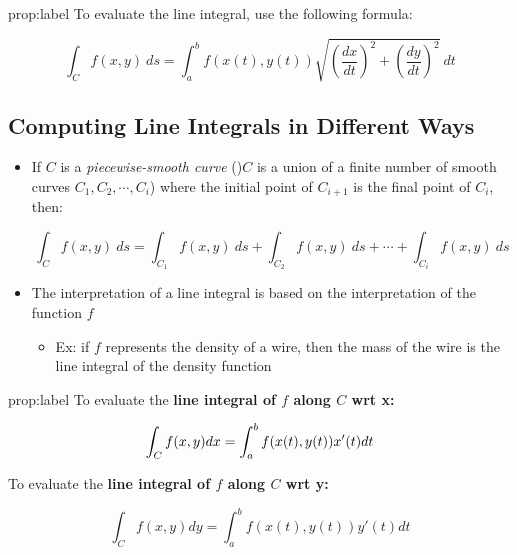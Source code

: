 \documentclass{package/notes}
\begin{document}
\begin{proposition}{prop:label}
	To evaluate the line integral, use the following formula:

	$$\int_Cf(x,y)\:ds=\int_a^bf(x(t),y(t))\sqrt{\left(\frac{dx}{dt}\right)^2+\left(\frac{dy}{dt}\right)^2}\:dt$$
\end{proposition}


\subsection{Computing Line Integrals in Different Ways}

\begin{itemize}
	\item If $C$ is a \textit{piecewise-smooth curve} ()$C$ is a union of a finite number of smooth curves $C_1,C_2,\cdots,C_i$) where the initial point of $C_{i+1}$ is the final point of $C_i$, then:
	
	$$\int_Cf(x,y)\:ds = \int_{C_1}f(x,y)\:ds + \int_{C_2}f(x,y)\:ds+\cdots+\int_{C_i}f(x,y)\:ds$$

	\item The interpretation of a line integral is based on the interpretation of the function $f$
	\begin{itemize}
		\item Ex: if $f$ represents the density of a wire, then the mass of the wire is the line integral of the density function
	\end{itemize}
\end{itemize}

\begin{proposition}{prop:label}
	To evaluate the \textbf{line integral of $f$ along $C$ wrt x:}

	$$\int_Cf(x,y)dx=\int_a^bf(x(t),y(t))x'(t)dt\\$$

	To evaluate the \textbf{line integral of $f$ along $C$ wrt y:}

	$$\int_Cf(x,y)dy=\int_a^bf(x(t),y(t))y'(t)dt$$
\end{proposition}
\end{document}
